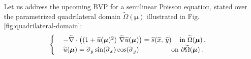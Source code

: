 \documentclass[12pt, a4paper, twoside, openright, notitlepage]{report}
\numberwithin{equation}{chapter}
\theoremstyle{theorem}
\theoremstyle{definition}
\theoremstyle{remark}
\theoremstyle{proposition}
\numberwithin{figure}{chapter}
\newcommand{\wt}[1]{\widetilde{#1}}
\newcommand{\bg}[1]{\boldsymbol{#1}}
\begin{document}
		Let us address the upcoming BVP for a semilinear Poisson equation, stated over the parametrized quadrilateral domain $\wt{\Omega}(\bg{\mu})$ illustrated in Fig. \ref{fig:quadrilateral-domain}: 
		\begin{equation}
			\label{eq:poisson2d-2}
			\begin{cases}
				& - \wt{\nabla} \cdot \big( (1 + \wt{u}(\bg{\mu})^2) ~ \wt{\nabla} \wt{u}(\bg{\mu}) \big) = \wt{s}(\wt{x}, \, \wt{y}) \hspace*{0.4cm} \text{in $\wt{\Omega}(\bg{\mu})$} \, , \\
				& \wt{u}(\bg{\mu}) = \wt{\sigma}_y \sin(\wt{\sigma}_x) \cos(\wt{\sigma}_y) \hspace*{1.65cm} \text{on $\partial \wt{\Omega}(\bg{\mu})$} \, .
			\end{cases}
		\end{equation}
\end{document}
